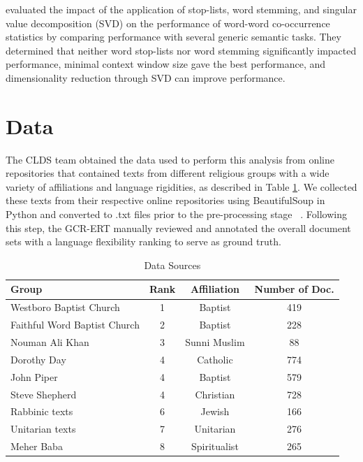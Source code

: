\documentclass[11pt]{article}
\begin{document}
 evaluated the impact of the application of stop-lists, word stemming, and singular value decomposition (SVD) on the performance of word-word co-occurrence statistics by comparing performance with several generic semantic tasks. They determined that neither word stop-lists nor word stemming significantly impacted performance, minimal context window size gave the best performance, and dimensionality reduction through SVD can improve performance.  

\section{Data}\label{data}

The CLDS team obtained the data used to perform this analysis from online repositories that contained texts from different religious groups with a wide variety of affiliations and language rigidities, as described in Table \ref{table:data}. We collected these texts from their respective online repositories using BeautifulSoup in Python and converted to .txt files prior to the pre-processing stage ~\cite{Richardson2015}. Following this step, the GCR-ERT manually reviewed and annotated the overall document sets with a language flexibility ranking to serve as ground truth.

\begin{table}[ht]
\caption{Data Sources}
\begin{center}
\begin{tabular}{lccc}
 \\  \hline
Group & Rank & Affiliation & Number of Doc.  \\ \hline
Westboro Baptist Church 		& 1 & Baptist		& 419 \\
Faithful Word Baptist Church	& 2 & Baptist		& 228 \\
Nouman Ali Khan			& 3 & Sunni Muslim	& 88 \\
Dorothy Day				& 4 & Catholic		& 774 \\
John Piper				& 4 & Baptist		& 579 \\
Steve Shepherd			& 4 & Christian		& 728 \\
Rabbinic texts				& 6 & Jewish		& 166 \\
Unitarian texts				& 7 & Unitarian		& 276 \\ 
Meher Baba				& 8 & Spiritualist	& 265 \\	

\end{tabular}
\end{center}
\label{table:data}
\end{table}
\end{document}
